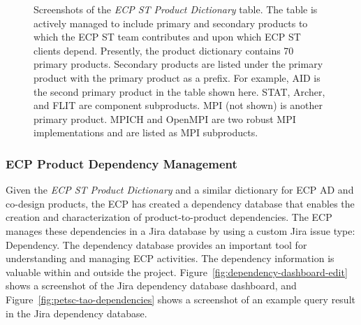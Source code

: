 \begin{figure}
	\centering
	\caption{Screenshots of the \textit{ECP ST Product Dictionary} table.  The table is actively managed to include primary and secondary products to which the ECP ST team contributes and upon which ECP ST clients depend.  Presently, the product dictionary contains 70 primary products.  Secondary products are listed under the primary product with the primary product as a prefix.  For example, AID is the second primary product in the table shown here.  STAT, Archer, and FLIT are component subproducts.  MPI (not shown) is another primary product.  MPICH and OpenMPI are two robust MPI implementations and are listed as MPI subproducts.}
	\label{fig:product-dictionary}
\end{figure}

\subsubsection{ECP Product Dependency Management}\label{subsubsect:dep-management}
Given the \textit{ECP ST Product Dictionary} and a similar dictionary for ECP AD and co-design products, the ECP has created a dependency database that enables the creation and characterization of product-to-product dependencies. The ECP manages these dependencies in a Jira database by using a custom Jira issue type: Dependency.  The dependency database provides an important tool for understanding and managing ECP activities.  The dependency information is valuable within and outside the project.  Figure~\ref{fig:dependency-dashboard-edit} shows a screenshot of the Jira dependency database dashboard, and Figure~\ref{fig:petsc-tao-dependencies}  shows a screenshot of an example query result in the Jira dependency database.

